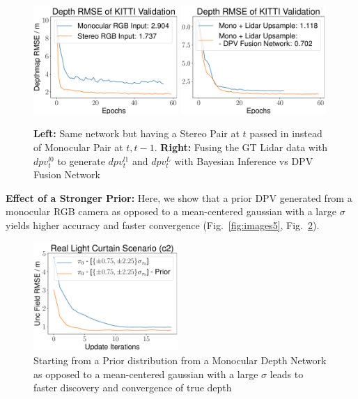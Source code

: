 \begin{figure}[H]
  \centering
  \begin{minipage}{0.5\textwidth}
      \centering
      \includegraphics[width=0.49\textwidth]{figures/Figure_6.pdf}
      \includegraphics[width=0.49\textwidth]{figures/Figure_7.pdf}
  \end{minipage}\hfill
  \centering
  \caption{ \textbf{Left:} Same network but having a Stereo Pair at $t$ passed in instead of Monocular Pair at $t, t-1$. \textbf{Right:} Fusing the GT Lidar data with $dpv_{t}^{l0}$ to generate $dpv_{t}^{l1}$ and $dpv_{t}^{L}$ with Bayesian Inference vs DPV Fusion Network}
  \label{fig:stereodpv} 
\end{figure}

\textbf{Effect of a Stronger Prior:} Here, we show that a prior DPV generated from a monocular RGB camera as opposed to a mean-centered gaussian with a large $\sigma$ yields higher accuracy and faster convergence (Fig.~\ref{fig:images5}, Fig.~\ref{fig:prior}).

\begin{figure}[h]
  \centering
  \begin{minipage}{0.5\textwidth}
      \centering
      \includegraphics[width=0.49\textwidth]{figures/figure_X.pdf}
  \end{minipage}\hfill
  \centering
  \caption{Starting from a Prior distribution from a Monocular Depth Network as opposed to a mean-centered gaussian with a large $\sigma$ leads to faster discovery and convergence of true depth}
  \label{fig:prior} 
\end{figure}


